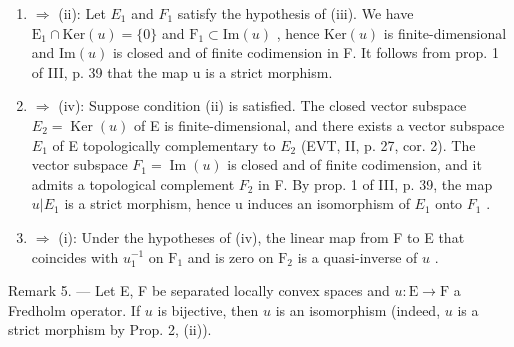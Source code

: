 \begin{enumerate}
\def\labelenumi{(\roman{enumi})}
\setcounter{enumi}{2}
\item
  \(\Longrightarrow\) (ii): Let \(E_{1}\) and \(F_{1}\) satisfy the hypothesis of (iii). We have \(\mathrm{E}_{1}\cap\mathrm{Ker}(u)=\{0\}\) and \(\mathrm{F}_{1}\subset\mathrm{Im}(u)\) , hence \(\mathrm{Ker}(u)\) is finite-dimensional and \(\mathrm{Im}(u)\) is closed and of finite codimension in F. It follows from prop. 1 of III, p. 39 that the map u is a strict morphism.
\item
   \(\Longrightarrow\) (iv): Suppose condition (ii) is satisfied. The closed vector subspace \(E_{2} = \operatorname{Ker}(u)\) of E is finite-dimensional, and there exists a vector subspace \(E_{1}\) of E topologically complementary to \(E_{2}\) (EVT, II, p. 27, cor. 2). The vector subspace \(F_{1} = \operatorname{Im}(u)\) is closed and of finite codimension, and it admits a topological complement \(F_{2}\) in F. By prop. 1 of III, p. 39, the map \(u|E_{1}\) is a strict morphism, hence u induces an isomorphism of \(E_{1}\) onto \(F_{1}\) .
\item
   \(\Longrightarrow\) (i): Under the hypotheses of (iv), the linear map from F to E that coincides with \(u_1^{-1}\) on \(\mathrm{F}_1\) and is zero on \(\mathrm{F}_2\) is a quasi-inverse of \(u\) .
\end{enumerate}

Remark 5. --- Let E, F be separated locally convex spaces and \(u\colon\mathrm{E}\to\mathrm{F}\) a Fredholm operator. If \(u\) is bijective, then \(u\) is an isomorphism (indeed, \(u\) is a strict morphism by Prop. 2, (ii)).

